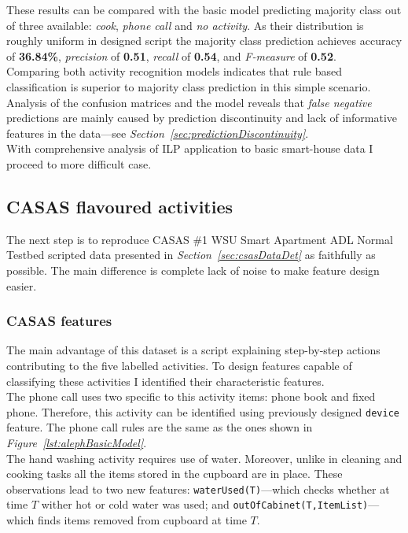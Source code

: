 \documentclass[10pt, a4paper, pdflatex, leqno, twoside, openright]{report}
\begin{document}
These results can be compared with the basic model predicting majority class out of three available: \emph{cook}, \emph{phone call} and \emph{no activity}. As their distribution is roughly uniform in designed script the majority class prediction achieves accuracy of \textbf{36.84\%}, \emph{precision} of \textbf{0.51}, \emph{recall} of \textbf{0.54}, and \emph{F-measure} of \textbf{0.52}.\\
Comparing both activity recognition models indicates that rule based classification is superior to majority class prediction in this simple scenario.\\

Analysis of the confusion matrices and the model reveals that \emph{false negative} predictions are mainly caused by prediction discontinuity and lack of informative features in the data---see \emph{Section~\ref{sec:predictionDiscontinuity}}.\\

With comprehensive analysis of ILP application to basic smart-house data I proceed to more difficult case.

    \subsection{CASAS flavoured activities}
The next step is to reproduce CASAS \#1 WSU Smart Apartment ADL Normal Testbed scripted data presented in \emph{Section~\ref{sec:csasDataDet}} as faithfully as possible. The main difference is complete lack of noise to make feature design easier.

      \subsubsection{CASAS features}
The main advantage of this dataset is a script explaining step-by-step actions contributing to the five labelled activities. To design features capable of classifying these activities I identified their characteristic features.\\

The phone call uses two specific to this activity items: phone book and fixed phone. Therefore, this activity can be identified using previously designed \texttt{device} feature. The phone call rules are the same as the ones shown in \emph{Figure~\ref{lst:alephBasicModel}}.\\

The hand washing activity requires use of water. Moreover, unlike in cleaning and cooking tasks all the items stored in the cupboard are in place. These observations lead to two new features: \texttt{waterUsed(T)}---which checks whether at time $T$ wither hot or cold water was used; and \texttt{outOfCabinet(T,ItemList)}---which finds items removed from cupboard at time $T$.\\
\end{document}
